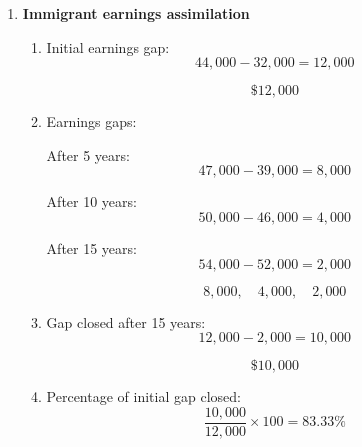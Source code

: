 \documentclass[12pt]{article}
\begin{document}
\begin{enumerate}[label=\textbf{Question \arabic*.}]
\begin{enumerate}[label=(\alph*)]
    So:
    \[
    PV=4000\left(\frac{1-0.253}{0.04}\right)
    \]

    \[
    PV=4000\left(\frac{0.747}{0.04}\right)
    \]

    \[
    PV=4000(18.675)=74{,}700
    \]

    \[
    \boxed{PV \approx \$74{,}700}
    \]

    \item Subtract moving cost:
    \[
    74{,}700 - 15{,}000 = 59{,}700
    \]

    Since this is positive, migration is worthwhile.

    \[
    \boxed{\text{Migration is worthwhile}}
    \]

    \item If moving cost rises to \$30{,}000:
    \[
    74{,}700 - 30{,}000 = 44{,}700
    \]

    Still positive, so migration is still worthwhile.

    \[
    \boxed{\text{Yes, migration is still worthwhile}}
    \]
\end{enumerate}


\item \textbf{Immigrant earnings assimilation}

\begin{enumerate}[label=(\alph*)]
    \item Initial earnings gap:
    \[
    44{,}000 - 32{,}000 = 12{,}000
    \]

    \[
    \boxed{\$12{,}000}
    \]

    \item Earnings gaps:

    After 5 years:
    \[
    47{,}000 - 39{,}000 = 8{,}000
    \]

    After 10 years:
    \[
    50{,}000 - 46{,}000 = 4{,}000
    \]

    After 15 years:
    \[
    54{,}000 - 52{,}000 = 2{,}000
    \]

    \[
    \boxed{8{,}000,\quad 4{,}000,\quad 2{,}000}
    \]

    \item Gap closed after 15 years:
    \[
    12{,}000 - 2{,}000 = 10{,}000
    \]

    \[
    \boxed{\$10{,}000}
    \]

    \item Percentage of initial gap closed:
    \[
    \frac{10{,}000}{12{,}000}\times 100 = 83.33\%
    \]


\end{enumerate}
\end{enumerate}
\end{document}
